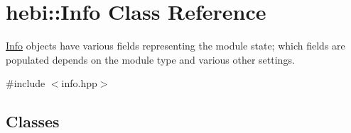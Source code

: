 \hypertarget{classhebi_1_1Info}{}\section{hebi\+:\+:Info Class Reference}
\label{classhebi_1_1Info}


\hyperlink{classhebi_1_1Info}{Info} objects have various fields representing the module state; which fields are populated depends on the module type and various other settings.  




{\ttfamily \#include $<$info.\+hpp$>$}

\subsection*{Classes}
